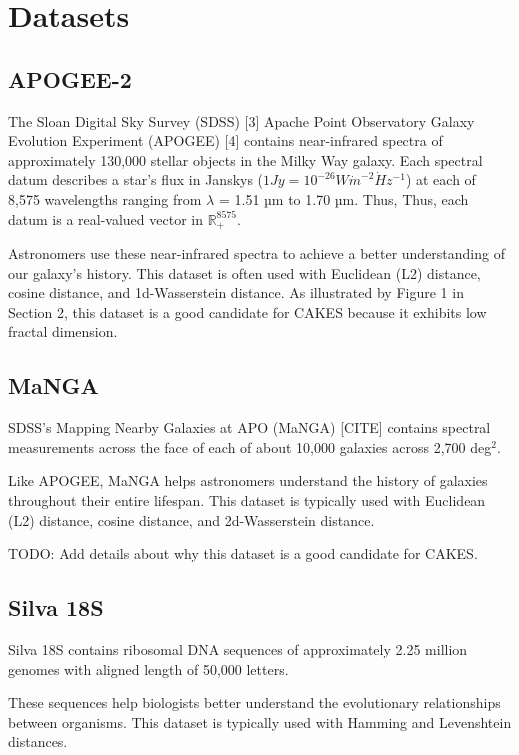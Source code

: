 
\section{Datasets}
\label{sec:datasets-and-distance-functions}

\subsection{APOGEE-2}
\label{subsec:datasets:apogee-2}
The Sloan Digital Sky Survey (SDSS) [3] Apache Point Observatory Galaxy Evolution
Experiment (APOGEE) [4] contains near-infrared
spectra of approximately 130,000 stellar objects in the Milky
Way galaxy. Each spectral datum describes a star's flux in
Janskys ($1 Jy = 10^{-26} W \dot m^{-2} \dot Hz^{-1}$) at each of 8,575 wavelengths ranging from $\lambda$ = 1.51 µm to 1.70 µm. Thus,
Thus, each datum is a real-valued vector in $\mathbb{R}_{+}^{8575}$. 

Astronomers use these near-infrared spectra to achieve a better understanding of our galaxy's history. This dataset 
is often used with Euclidean (L2) distance, cosine distance, and 1d-Wasserstein distance. As illustrated by Figure 1 in Section 2,
this dataset is a good candidate for CAKES because it exhibits low fractal dimension. 

\subsection{MaNGA}
\label{subsec:datasets:manga}
SDSS's Mapping Nearby Galaxies at APO (MaNGA) [CITE] contains spectral measurements across the face of each of 
about 10,000 galaxies across 2,700 deg$^2$. 

Like APOGEE, MaNGA helps astronomers understand the history of galaxies throughout their entire lifespan. This 
dataset is typically used with Euclidean (L2) distance, cosine distance, and 2d-Wasserstein distance. 


TODO: Add details about why this dataset is a good candidate for CAKES. 

\subsection{Silva 18S}
\label{subsec:datasets:silva-18s}

Silva 18S contains ribosomal DNA sequences of approximately 2.25 
million genomes with aligned length of 50,000 letters. 


These sequences help biologists better understand the evolutionary relationships between organisms. 
This dataset is typically used with Hamming and Levenshtein distances. 


